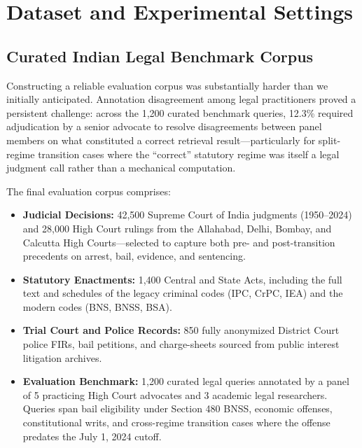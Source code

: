 \documentclass[conference]{IEEEtran}
\begin{document}
\section{Dataset and Experimental Settings}

\subsection{Curated Indian Legal Benchmark Corpus}
Constructing a reliable evaluation corpus was substantially harder than we initially anticipated. Annotation disagreement among legal practitioners proved a persistent challenge: across the 1,200 curated benchmark queries, 12.3\% required adjudication by a senior advocate to resolve disagreements between panel members on what constituted a correct retrieval result---particularly for split-regime transition cases where the ``correct'' statutory regime was itself a legal judgment call rather than a mechanical computation.

The final evaluation corpus comprises:
\begin{itemize}
    \item \textbf{Judicial Decisions:} 42,500 Supreme Court of India judgments (1950--2024) and 28,000 High Court rulings from the Allahabad, Delhi, Bombay, and Calcutta High Courts---selected to capture both pre- and post-transition precedents on arrest, bail, evidence, and sentencing.
    \item \textbf{Statutory Enactments:} 1,400 Central and State Acts, including the full text and schedules of the legacy criminal codes (IPC, CrPC, IEA) and the modern codes (BNS, BNSS, BSA).
    \item \textbf{Trial Court and Police Records:} 850 fully anonymized District Court police FIRs, bail petitions, and charge-sheets sourced from public interest litigation archives.
    \item \textbf{Evaluation Benchmark:} 1,200 curated legal queries annotated by a panel of 5 practicing High Court advocates and 3 academic legal researchers. Queries span bail eligibility under Section 480 BNSS, economic offenses, constitutional writs, and cross-regime transition cases where the offense predates the July 1, 2024 cutoff.
\end{itemize}
\end{document}

